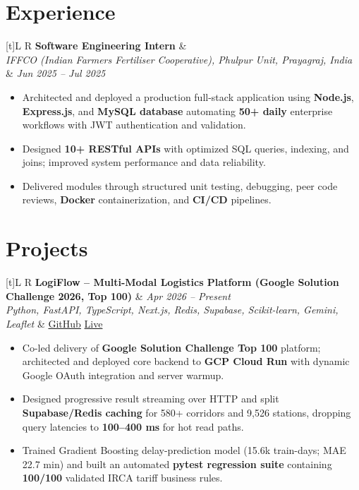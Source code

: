 \documentclass[a4paper,10pt]{article}
\newcommand{\resumeSubheading}[4]{
  \vspace{0.5mm}
  \noindent
  \begin{tabularx}{\textwidth}[t]{L R}
    \textbf{#1} & #4 \\
    \textit{#3} & \textit{#2} \\
  \end{tabularx}
  \vspace{-0.5mm}
}
\newcommand{\resumeProject}[4]{
  \vspace{0.5mm}
  \noindent
  \begin{tabularx}{\textwidth}[t]{L R}
    \textbf{#1} & \textit{#3} \\
    \textit{#2} & #4 \\
  \end{tabularx}
  \vspace{-0.5mm}
}
\begin{document}
\section{Experience}
\small
\resumeSubheading
  {Software Engineering Intern}{Jun 2025 -- Jul 2025}
  {IFFCO (Indian Farmers Fertiliser Cooperative), Phulpur Unit, Prayagraj, India}{}
\begin{itemize}
  \item Architected and deployed a production full-stack application using \textbf{Node.js}, \textbf{Express.js}, and \textbf{MySQL database} automating \textbf{50+ daily} enterprise workflows with JWT authentication and validation.
  \item Designed \textbf{10+ RESTful APIs} with optimized SQL queries, indexing, and joins; improved system performance and data reliability.
  \item Delivered modules through structured unit testing, debugging, peer code reviews, \textbf{Docker} containerization, and \textbf{CI/CD} pipelines.
\end{itemize}

\section{Projects}
\small

\resumeProject
  {LogiFlow -- Multi-Modal Logistics Platform (Google Solution Challenge 2026, Top 100)}
  {Python, FastAPI, TypeScript, Next.js, Redis, Supabase, Scikit-learn, Gemini, Leaflet}
  {Apr 2026 -- Present}
  {\href{https://github.com/Ojas-Srivastava05/LogiFlow-Solution-Challenge-2026}{GitHub} \textbar{} \href{https://logi-flow-solution-challenge-2026.vercel.app/}{Live}}
\begin{itemize}
  \item Co-led delivery of \textbf{Google Solution Challenge Top 100} platform; architected and deployed core backend to \textbf{GCP Cloud Run} with dynamic Google OAuth integration and server warmup.
  \item Designed progressive result streaming over HTTP and split \textbf{Supabase/Redis caching} for 580+ corridors and 9,526 stations, dropping query latencies to \textbf{100--400 ms} for hot read paths.
  \item Trained Gradient Boosting delay-prediction model (15.6k train-days; MAE 22.7 min) and built an automated \textbf{pytest regression suite} containing \textbf{100/100} validated IRCA tariff business rules.
\end{itemize}
\end{document}
